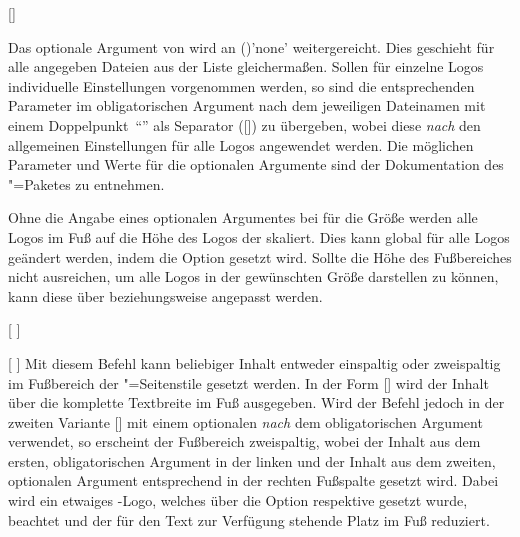 \begin{Declaration*}{}
\begin{Declaration*}{}
\begin{Declaration*}{}
\begin{Declaration}[v2.03]{%
  [\LParameter{}]%
}
\begin{Declaration}[v2.03]{}
Das optionale Argument von  wird an 
()'none' weitergereicht. Dies 
geschieht für alle angegeben Dateien aus der Liste gleichermaßen. Sollen für 
einzelne Logos individuelle Einstellungen vorgenommen werden, so sind die 
entsprechenden Parameter im obligatorischen Argument nach dem jeweiligen 
Dateinamen mit einem Doppelpunkt~\enquote{\PValue{:}} als Separator 
([]) zu 
übergeben, wobei diese \emph{nach} den allgemeinen Einstellungen für alle Logos 
angewendet werden. Die möglichen Parameter und Werte für die optionalen 
Argumente sind der Dokumentation des "=Paketes zu entnehmen.
\end{Declaration}
\end{Declaration}

\begin{Declaration}[v2.05]{}%
\printdeclarationlist%
%
Ohne die Angabe eines optionalen Argumentes bei  für die Größe 
werden alle Logos im Fuß auf die Höhe des Logos der \TnUD skaliert. Dies kann 
global für alle Logos geändert werden, indem die Option 
 gesetzt wird. Sollte die Höhe des 
Fußbereiches nicht ausreichen, um alle Logos in der gewünschten Größe 
darstellen zu können, kann diese über  
beziehungsweise  angepasst werden.
\end{Declaration}

\begin{Declaration}{%
  [%
  ]%
}
\begin{Declaration}[v2.04]{%
  [%
  ]%
}
\printdeclarationlist%
%
%
Mit diesem Befehl kann beliebiger Inhalt entweder einspaltig oder zweispaltig 
im Fußbereich der "=Seitenstile gesetzt werden. In der 
Form [] wird der Inhalt über die komplette 
Textbreite im Fuß ausgegeben. Wird der Befehl jedoch in der zweiten Variante 
[] mit 
einem optionalen \emph{nach} dem obligatorischen Argument verwendet, so 
erscheint der Fußbereich zweispaltig, wobei der Inhalt aus dem ersten, 
obligatorischen Argument in der linken und der Inhalt aus dem zweiten, 
optionalen Argument entsprechend in der rechten Fußspalte gesetzt wird. Dabei 
wird ein etwaiges \DDC-Logo, welches über die Option  respektive
 gesetzt wurde, beachtet und der für den Text zur Verfügung 
stehende Platz im Fuß reduziert.


\end{Declaration}
\end{Declaration}
\end{Declaration*}
\end{Declaration*}
\end{Declaration*}
